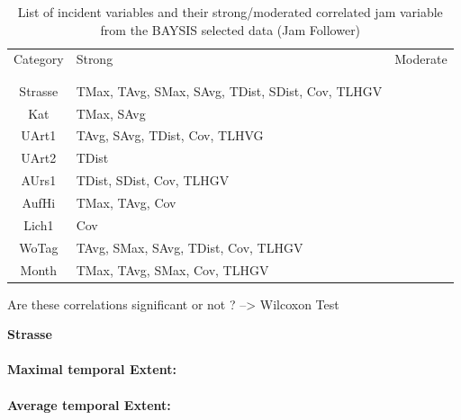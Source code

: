 \begin{table}[ht]
\noindent
\begin{table}[h!]
	\centering
	\begin{tabular}{c|l|l}  
		Category & Strong & Moderate \\
		\\[-1em]
		\hline
		\\[-1em]
		Strasse & TMax, TAvg, SMax, SAvg, TDist, SDist, Cov, TLHGV & \\ 
 		Kat & TMax, SAvg & \\ 
 		UArt1 & TAvg, SAvg, TDist, Cov, TLHVG & \\
 		UArt2 & TDist & \\
 		AUrs1 & TDist, SDist, Cov, TLHGV & \\
 		AufHi & TMax, TAvg, Cov & \\
 		Lich1 & Cov & \\
 		WoTag & TAvg, SMax, SAvg, TDist, Cov, TLHGV & \\
 		Month & TMax, TAvg, SMax, Cov, TLHGV & \\
	\end{tabular}
	\caption{List of incident variables and their strong/moderated correlated jam variable from the BAYSIS selected data (Jam Follower)}
\end{table}

Are these correlations significant or not ? --> Wilcoxon Test

\large
\centerline{\textbf{Strasse}}
\normalsize

\paragraph{Maximal temporal Extent:}
\paragraph{Average temporal Extent:}

\end{table}
